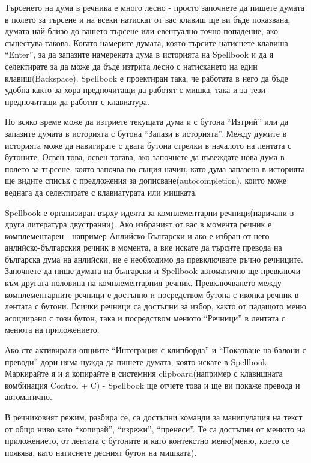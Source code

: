 Търсенето на дума в речника е много лесно - просто започнете да пишете
думата в полето за търсене и на всеки натискат от вас клавиш ще ви
бъде показвана, думата най-близо до вашето търсене или евентуално
точно попадение, ако същестува такова. Когато намерите думата, която
търсите натиснете клавиша "`Enter"', за да запазите намерената дума в
историята на Spellbook и да я селектирате за да може да бъде изтрита
лесно с натискането на един клавиш(Backspace). Spellbook е проектиран
така, че работата в него да бъде удобна както за хора предпочитащи да
работят с мишка, така и за тези предпочитащи да работят с клавиатура.

По всяко време може да изтриете текущата дума и с бутона "`Изтрий"'
или да запазите думата в историята с бутона "`Запази в
историята"'. Между думите в историята може да навигирате с двата
бутона стрелки в началото на лентата с бутоните. Освен това, освен
тогава, ако започнете да въвеждате нова дума в полето за търсене,
която започва по същия начин, като дума запазена в историята ще видите
списък с предложения за дописване(autocompletion), които може веднага
да селектирате с клавиатурата или мишката.

Spellbook е организиран върху идеята за комплементарни
речници(наричани в друга литература двустранни). Ако избраният от вас
в момента речник е комплементарен - например Анлийско-Български и ако
е избран от него анлийско-българския речник в момента, а вие искате да
търсите превода на българска дума на анлийски, не е необходимо да
превключвате ръчно речниците. Започнете да пише думата на български и
Spellbook автоматично ще превключи към другата половина на
комплементарния речник. Превключването между комплементарните речници
е достъпно и посредством бутона с иконка речник в лентата с
бутони. Всички речници са достъпни за избор, както от падащото меню
асоциирано с този бутон, така и посредством менюто "`Речници"' в
лентата с менюта на приложението.

Ако сте активирали опциите "`Интеграция с клипборда"' и "`Показване на
балони с преводи"' дори няма нужда да пишете думата, която искате в
Spellbook. Маркирайте я и я копирайте в системния clipboard(например с
клавишната комбинация Control + C) - Spellbook ще отчете това и ще ви
покаже превода и автоматично.

В речниковият режим, разбира се, са достъпни команди за манипулация на
текст от общо ниво като "`копирай"', "`изрежи"', "`пренеси"'. Те са
достъпни от менюто на приложението, от лентата с бутоните и като
контекстно меню(меню, което се появява, като натиснете десният бутон
на мишката).
